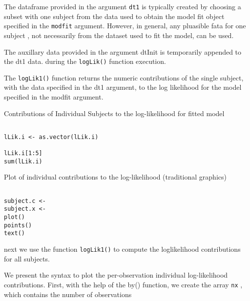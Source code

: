 \documentclass[a4paper,12pt]{article}
\begin{document}

The dataframe provided in the argument \texttt{dt1} is typically created by choosing a subset with one subject from the data used to obtain the model fit object specified in the \texttt{modfit} argument.
However, in general, any pluasible fata for one subject , not necessarily from the dataset used to fit the model, can be used.


The auxillary data provided in the argument dtInit is temporarily appended to the dt1 data. during the \texttt{logLik()} function execution.



The \texttt{logLik1()} function returns the numeric contributions of the single subject, with the data specified in the dt1 argument, to the log likelihood
for the model specified in the modfit argument.



Contributions of Individual Subjects to the log-likelihood for fitted model


\begin{framed}
\begin{verbatim}

lLik.i <- as.vector(lLik.i)

lLik.i[1:5]
sum(lLik.i)

\end{verbatim}
\end{framed}

Plot of individual contributions to the log-likelihood (traditional graphics)
\begin{framed}
\begin{verbatim}

subject.c <-
subject.x <- 
plot()
points()
text()
\end{verbatim}
\end{framed}

next we use the function \texttt{logLik1()} to compute the loglikelihood
contributions for all subjects.

We present the syntax to plot the per-observation individual log-likelihood contributions.
First, with the help of the by() function, we create the array \texttt{nx} , which contains the number
of observations
\end{document}
